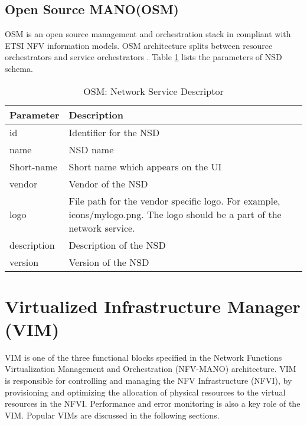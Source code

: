 \subsection{Open Source MANO(OSM)}
\label{SecOSM}
OSM is an open source management and orchestration stack in compliant with ETSI NFV information models. OSM architecture splits between resource orchestrators and service orchestrators \cite{de2018network}. Table \ref{tab:OSM_nsd} lists the parameters of NSD schema. \cite{OSMSchemaDocumentation}
    \begin{table}[h]
        \centering
    \begin{tabular}{ |p{4cm}|p{10cm}|}
        \hline
        \textbf{Parameter} & \textbf{Description} \\
        \hline
         
         id &   Identifier for the NSD \\
         \hline
         name & NSD name \\
         \hline
         Short-name &   Short name which appears on the UI \\
         \hline
         vendor &   Vendor of the NSD \\
         \hline
         logo & File path for the vendor specific logo. For example, icons/mylogo.png. The logo should be a part of the network service. \\
         \hline
         description &  Description of the NSD \\
         \hline
         version &  Version of the NSD \\
         \hline
    \end{tabular}
        \caption{OSM: Network Service Descriptor}
    \label{tab:OSM_nsd}
 \end{table}



\newpage
\section{Virtualized Infrastructure Manager (VIM)}
VIM is one of the three functional blocks specified in the Network Functions Virtualization Management and Orchestration (NFV-MANO) architecture. VIM is responsible for controlling and managing the NFV Infrastructure (NFVI), by provisioning and optimizing the allocation of physical resources to the virtual resources in the NFVI. Performance and error monitoring is also a key role of the VIM. Popular VIMs are discussed in the following sections.

